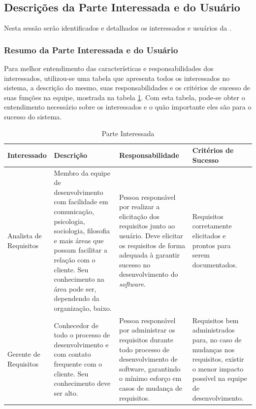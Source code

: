 \subsection{Descrições da Parte Interessada e do Usuário}

Nesta sessão serão identificados e detalhados os interessados e usuários da \nomeferramenta{}.

\subsubsection{Resumo da Parte Interessada e do Usuário}

Para melhor entendimento das características e responsabilidades dos interessados, utilizou-se uma tabela que apresenta todos os interessados no sistema, a descrição do mesmo, suas responsabilidades e os critérios de sucesso de suas funções na equipe, mostrada na tabela \ref{tab:parteInteressada}. Com esta tabela, pode-se obter o entendimento necessário sobre os interessados e o quão importante eles são para o sucesso do sistema.

\begin{table}[htbp]
\centering
\begin{tabular}{|p{2cm}|p{5cm}|p{4cm}|p{4cm}|}
\hline
\textbf{Interessado} &
\textbf{Descrição} &
\textbf{Responsabilidade} &
\textbf{Critérios de Sucesso}
\\ \hline

Analista de Requisitos &
Membro da equipe de desenvolvimento com facilidade em comunicação, psicologia, sociologia, filosofia e mais áreas que possam facilitar a relação com o cliente. Seu conhecimento na área pode ser, dependendo da organização, baixo. &
Pessoa responsável por realizar a elicitação dos requisitos junto ao usuário. Deve elicitar os requisitos de forma adequada à garantir sucesso no desenvolvimento do \textit{software}. &
Requisitos corretamente elicitados e prontos para serem documentados. 
\\ \hline
Gerente de Requisitos &
Conhecedor de todo o processo de desenvolvimento e com contato frequente com o cliente. Seu conhecimento deve ser alto. &
Pessoa responsável por administrar os requisitos durante todo processo de desenvolvimento de software, garantindo o mínimo esforço em casos de mudança de requisitos. &
Requisitos bem administrados para, no caso de mudanças nos requisitos, existir o menor impacto possível na equipe de desenvolvimento.
\\ \hline
\end{tabular}
\label{}
\caption{Parte Interessada}
\label{tab:parteInteressada}
\end{table}

